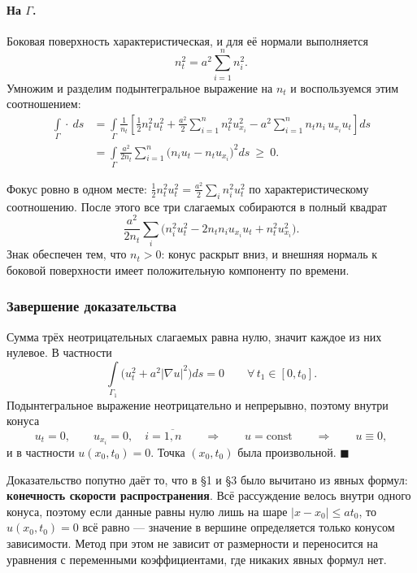 \paragraph{На $\Gamma$.} Боковая поверхность характеристическая, и для её
нормали выполняется
\[
  n_t^2 = a^2 \sum_{i=1}^{n} n_i^2 .
\]
Умножим и разделим подынтегральное выражение на $n_t$ и воспользуемся этим
соотношением:
\begin{align*}
  \int\limits_{\Gamma} \cdot\ ds
  &= \int\limits_{\Gamma} \frac{1}{n_t}\left[
       \frac12 n_t^2 u_t^2
       + \frac{a^2}{2} \sum_{i=1}^{n} n_t^2 u_{x_i}^2
       - a^2 \sum_{i=1}^{n} n_t n_i\, u_{x_i} u_t
     \right] ds \\[4pt]
  &= \int\limits_{\Gamma} \frac{a^2}{2 n_t} \sum_{i=1}^{n}
     \big(n_i u_t - n_t u_{x_i}\big)^2 ds \ \ge\ 0 .
\end{align*}

\begin{idea}
Фокус ровно в одном месте: $\tfrac12 n_t^2 u_t^2 = \tfrac{a^2}{2}\sum_i n_i^2
u_t^2$ по характеристическому соотношению. После этого все три слагаемых
собираются в полный квадрат
\[
  \frac{a^2}{2 n_t} \sum_i \Big(n_i^2 u_t^2 - 2 n_t n_i u_{x_i} u_t
  + n_t^2 u_{x_i}^2\Big) .
\]
Знак обеспечен тем, что $n_t > 0$: конус раскрыт вниз, и внешняя нормаль к
боковой поверхности имеет положительную компоненту по времени.
\end{idea}

\subsubsection*{Завершение доказательства}

Сумма трёх неотрицательных слагаемых равна нулю, значит каждое из них нулевое. В
частности
\[
  \int\limits_{\Gamma_1} \Big(u_t^2 + a^2 |\nabla u|^2\Big) ds = 0
  \qquad \forall\, t_1 \in [0,t_0] .
\]
Подынтегральное выражение неотрицательно и непрерывно, поэтому внутри конуса
\[
  u_t = 0, \qquad u_{x_i} = 0, \quad i = \overline{1,n}
  \qquad\Longrightarrow\qquad u = \mathrm{const}
  \qquad\Longrightarrow\qquad u \equiv 0 ,
\]
и в частности $u(x_0,t_0) = 0$. Точка $(x_0,t_0)$ была произвольной.
\hfill$\blacksquare$

\begin{idea}
Доказательство попутно даёт то, что в \S1 и \S3 было вычитано из явных формул:
\textbf{конечность скорости распространения}. Всё рассуждение велось внутри
одного конуса, поэтому если данные равны нулю лишь на шаре
$|x - x_0| \le a t_0$, то $u(x_0,t_0) = 0$ всё равно — значение в вершине
определяется только конусом зависимости. Метод при этом не зависит от
размерности и переносится на уравнения с переменными коэффициентами, где
никаких явных формул нет.
\end{idea}
